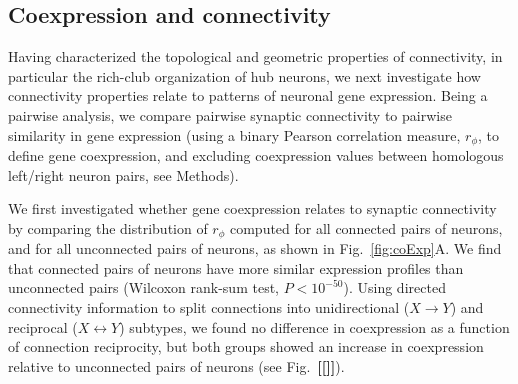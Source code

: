 \documentclass[10pt,letterpaper]{article}
\begin{document}

\subsection*{Coexpression and connectivity}

Having characterized the topological and geometric properties of connectivity, in particular the rich-club organization of hub neurons, we next investigate how connectivity properties relate to patterns of neuronal gene expression.
Being a pairwise analysis, we compare pairwise synaptic connectivity to pairwise similarity in gene expression (using a binary Pearson correlation measure, $r_\phi$, to define gene coexpression, and excluding coexpression values between homologous left/right neuron pairs, see Methods).

We first investigated whether gene coexpression relates to synaptic connectivity by comparing the distribution of $r_\phi$ computed for all connected pairs of neurons, and for all unconnected pairs of neurons, as shown in Fig.~\ref{fig:coExp}A.
We find that connected pairs of neurons have more similar expression profiles than unconnected pairs (Wilcoxon rank-sum test, $P < 10^{-50}$).
Using directed connectivity information to split connections into unidirectional ($X \rightarrow Y$) and reciprocal ($X \leftrightarrow Y$) subtypes, we found no difference in coexpression as a function of connection reciprocity, but both groups showed an increase in coexpression relative to unconnected pairs of neurons (see Fig.~\textbf{[[]]}).
\end{document}
